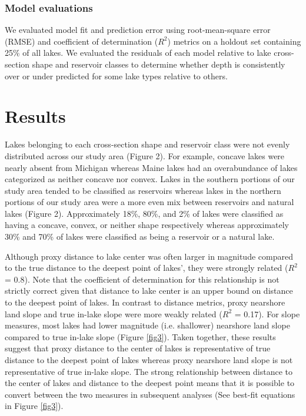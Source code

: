 \documentclass[draft]{agujournal2019}
\begin{document}
\subsubsection{Model evaluations}
\noindent
We evaluated model fit and prediction error using root-mean-square error (RMSE) and coefficient of determination ($R^2$) metrics on a holdout set containing 25\% of all lakes. We evaluated the residuals of each model relative to lake cross-section shape and reservoir classes to determine whether depth is consistently over or under predicted for some lake types relative to others.

\section{Results}
\noindent
Lakes belonging to each cross-section shape and reservoir class were not evenly distributed across our study area (Figure 2). For example, concave lakes were nearly absent from Michigan whereas Maine lakes had an overabundance of lakes categorized as neither concave nor convex. Lakes in the southern portions of our study area tended to be classified as reservoirs whereas lakes in the northern portions of our study area were a more even mix between reservoirs and natural lakes (Figure 2). Approximately 18\%, 80\%, and 2\% of lakes were classified as having a concave, convex, or neither shape respectively whereas approximately 30\% and 70\% of lakes were classified as being a reservoir or a natural lake.

Although proxy distance to lake center was often larger in magnitude compared to the true distance to the deepest point of lakes’, they were strongly related ($R^2$ = 0.8). Note that the coefficient of determination for this relationship is not strictly correct given that distance to lake center is an upper bound on distance to the deepest point of lakes. In contrast to distance metrics, proxy nearshore land slope and true in-lake slope were more weakly related ($R^2$ = 0.17). For slope measures, most lakes had lower magnitude (i.e. shallower) nearshore land slope compared to true in-lake slope (Figure \ref{fig3}). Taken together, these results suggest that proxy distance to the center of lakes is representative of true distance to the deepest point of lakes whereas proxy nearshore land slope is not representative of true in-lake slope. The strong relationship between distance to the center of lakes and distance to the deepest point means that it is possible to convert between the two measures in subsequent analyses (See best-fit equations in Figure \ref{fig3}).
\end{document}
